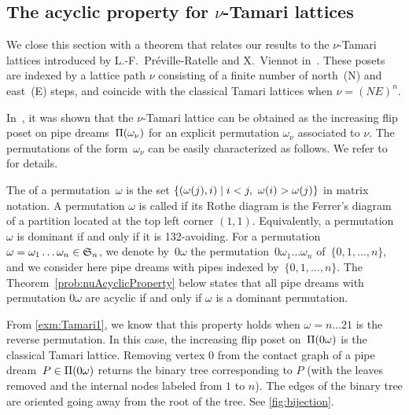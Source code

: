 \subsection{The acyclic property for $\nu$-Tamari lattices} 
\label{subsec:nuTamari} 

We close this section with a theorem that relates our results to the $\nu$-Tamari lattices introduced by L.-F.~Préville-Ratelle and X.~Viennot in~\cite{PrevilleRatelleViennot}. These posets are indexed by a lattice path $\nu$ consisting of a finite number of north~(N) and east~(E) steps, and coincide with the classical Tamari lattices when $\nu=(NE)^n$.

In~\cite{CeballosPadrolSarmiento}, it was shown that the $\nu$-Tamari lattice can be obtained as the increasing flip poset on pipe dreams~$\Pi(\omega_\nu)$ for an explicit permutation $\omega_\nu$ associated to $\nu$. The permutations of the form~$\omega_\nu$ can be easily characterized as follows. We refer to~\cite{CeballosPadrolSarmiento} for details. 

The  of a permutation~$\omega$ is the set $\set{(\omega(j),i)}{i<j,\ \omega(i)>\omega(j)}$ in matrix notation.
A permutation $\omega$ is called  if its Rothe diagram is the Ferrer's diagram of a partition located at the top left corner $(1,1)$. Equivalently, a permutation~$\omega$ is dominant if and only if it is 132-avoiding. 
For a permutation~$\omega = \omega_1 \dots \omega_n \in \mathfrak{S}_n$, we denote by~$0\omega$ the permutation~$0 \omega_1 \dots \omega_n$ of~$\{0, 1, \dots, n\}$, and we consider here pipe dreams with pipes indexed by~$\{0, 1, \dots, n\}$. The Theorem~\ref{prob:nuAcyclicProperty} below states that all pipe dreams with permutation $0 \omega$ are acyclic if and only if $\omega$ is a dominant permutation.


From \cref{exm:Tamari1}, we know that this property holds when $\omega=n\dots21$ is the reverse permutation. 
In this case, the increasing flip poset on~$\Pi(0 \omega)$ is the classical Tamari lattice. Removing vertex $0$ from the contact graph of a pipe dream~$ P\in \Pi(0 \omega)$ returns the binary tree corresponding to $P$ (with the leaves removed and the internal nodes labeled from $1$ to $n$).
The edges of the binary tree are oriented going away from the root of the tree.  
See \cref{fig:bijection}. 

